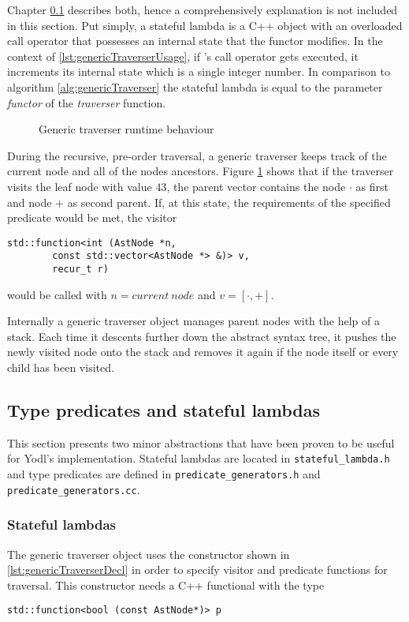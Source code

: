 %
Chapter \ref{sec:typePredicates} describes both, hence a comprehensively
explanation is not included in this section. Put simply, a stateful
lambda is a C++ object with an overloaded call operator that possesses
an internal state that the functor modifies.
In the context of \ref{lst:genericTraverserUsage}, if 's call
operator gets executed, it increments its internal state which is
a single integer number. In comparison to algorithm \ref{alg:genericTraverser}
the stateful lambda  is equal to the parameter \emph{functor}
of the \emph{traverser} function.
%
\begin{figure}[tb]
    \centering
    \caption{Generic traverser runtime behaviour}
    
    \label{fig:genTravRuntime}
\end{figure}
%
During the recursive, pre-order traversal, a generic traverser keeps
track of the current node and all of the nodes ancestors. Figure
\ref{fig:genTravRuntime} shows that if the traverser visits the leaf
node with value \(43\), the parent vector contains the node \(\cdot\)
as first and node \(+\) as second parent. If, at this state, the
requirements of the specified predicate would be met, the visitor
%
\begin{lstlisting}[style=c++]
std::function<int (AstNode *n,
        const std::vector<AstNode *> &)> v,
        recur_t r)
\end{lstlisting}
%
would be called with \(n = current\ node\) and \(v = [\cdot, +]\).

Internally a generic traverser object manages parent nodes with the
help of a stack. Each time it descents further down the abstract
syntax tree, it pushes the newly visited node onto the stack and
removes it again if the node itself or every child has been visited.

\subsection{Type predicates and stateful lambdas}
\label{sec:typePredicates}

This section presents two minor abstractions that have been proven to
be useful for Yodl's implementation. Stateful lambdas are located in
\texttt{stateful_lambda.h} and type predicates are defined in
\texttt{predicate_generators.h} and
\texttt{predicate_generators.cc}.

\subsubsection{Stateful lambdas}
\label{sec:statefulLambdas}
The generic traverser object uses the constructor shown in
\ref{lst:genericTraverserDecl} in order to specify visitor and
predicate functions for
traversal.
This constructor needs a C++ functional with the type
\begin{lstlisting}[style=c++]
std::function<bool (const AstNode*)> p
\end{lstlisting}

